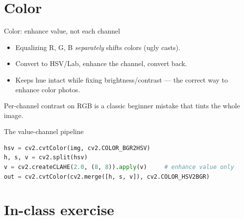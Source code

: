 \documentclass[10pt,aspectratio=169]{beamer}
\begin{document}
\section{Color}

\begin{frame}{Color: enhance value, not each channel}
  \begin{itemize}
    \item Equalizing R, G, B \emph{separately} shifts colors (ugly casts).
    \item Convert to HSV/Lab, enhance the  channel, convert back.
    \item Keeps hue intact while fixing brightness/contrast — the correct way to enhance color photos.
  \end{itemize}
  \begin{badbox}
    Per-channel contrast on RGB is a classic beginner mistake that tints the whole image.
  \end{badbox}
\end{frame}

\begin{frame}[fragile]{The value-channel pipeline}
  \begin{center}
  \end{center}
\begin{lstlisting}[language=Python]
hsv = cv2.cvtColor(img, cv2.COLOR_BGR2HSV)
h, s, v = cv2.split(hsv)
v = cv2.createCLAHE(2.0, (8, 8)).apply(v)     # enhance value only
out = cv2.cvtColor(cv2.merge([h, s, v]), cv2.COLOR_HSV2BGR)
\end{lstlisting}
\end{frame}

\section{In-class exercise}
\end{document}
